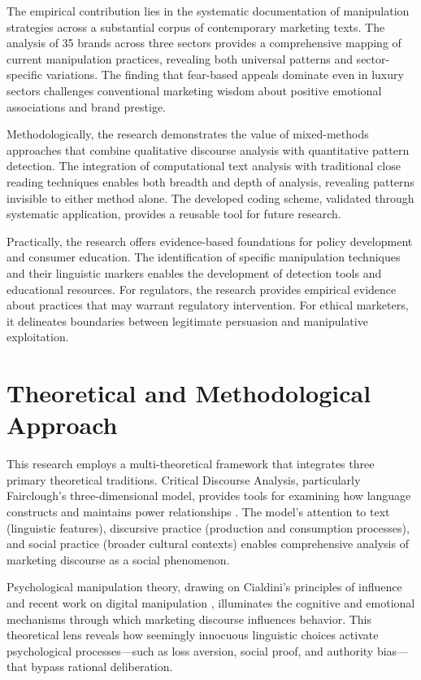 The empirical contribution lies in the systematic documentation of manipulation strategies across a substantial corpus of contemporary marketing texts. The analysis of 35 brands across three sectors provides a comprehensive mapping of current manipulation practices, revealing both universal patterns and sector-specific variations. The finding that fear-based appeals dominate even in luxury sectors challenges conventional marketing wisdom about positive emotional associations and brand prestige.

Methodologically, the research demonstrates the value of mixed-methods approaches that combine qualitative discourse analysis with quantitative pattern detection. The integration of computational text analysis with traditional close reading techniques enables both breadth and depth of analysis, revealing patterns invisible to either method alone. The developed coding scheme, validated through systematic application, provides a reusable tool for future research.

Practically, the research offers evidence-based foundations for policy development and consumer education. The identification of specific manipulation techniques and their linguistic markers enables the development of detection tools and educational resources. For regulators, the research provides empirical evidence about practices that may warrant regulatory intervention. For ethical marketers, it delineates boundaries between legitimate persuasion and manipulative exploitation.

\section{Theoretical and Methodological Approach}
\label{sec:theoretical_approach}

This research employs a multi-theoretical framework that integrates three primary theoretical traditions. Critical Discourse Analysis, particularly Fairclough's three-dimensional model, provides tools for examining how language constructs and maintains power relationships \cite{fairclough2015language}. The model's attention to text (linguistic features), discursive practice (production and consumption processes), and social practice (broader cultural contexts) enables comprehensive analysis of marketing discourse as a social phenomenon.

Psychological manipulation theory, drawing on Cialdini's principles of influence \cite{cialdini2021influence} and recent work on digital manipulation \cite{calo2014digital}, illuminates the cognitive and emotional mechanisms through which marketing discourse influences behavior. This theoretical lens reveals how seemingly innocuous linguistic choices activate psychological processes—such as loss aversion, social proof, and authority bias—that bypass rational deliberation.

